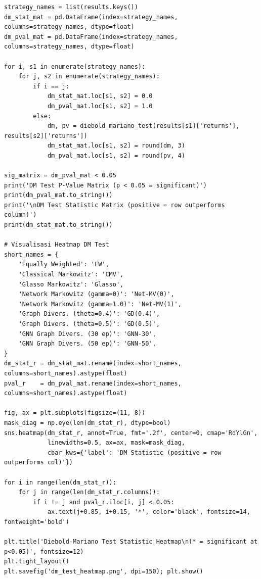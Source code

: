 \documentclass[12pt,a4paper]{article}
\begin{document}
\begin{lstlisting}[caption={Komputasi Matriks DM Test}]
strategy_names = list(results.keys())
dm_stat_mat = pd.DataFrame(index=strategy_names, columns=strategy_names, dtype=float)
dm_pval_mat = pd.DataFrame(index=strategy_names, columns=strategy_names, dtype=float)

for i, s1 in enumerate(strategy_names):
    for j, s2 in enumerate(strategy_names):
        if i == j:
            dm_stat_mat.loc[s1, s2] = 0.0
            dm_pval_mat.loc[s1, s2] = 1.0
        else:
            dm, pv = diebold_mariano_test(results[s1]['returns'], results[s2]['returns'])
            dm_stat_mat.loc[s1, s2] = round(dm, 3)
            dm_pval_mat.loc[s1, s2] = round(pv, 4)

sig_matrix = dm_pval_mat < 0.05
print('DM Test P-Value Matrix (p < 0.05 = significant)')
print(dm_pval_mat.to_string())
print('\nDM Test Statistic Matrix (positive = row outperforms column)')
print(dm_stat_mat.to_string())

# Visualisasi Heatmap DM Test
short_names = {
    'Equally Weighted': 'EW',
    'Classical Markowitz': 'CMV',
    'Glasso Markowitz': 'Glasso',
    'Network Markowitz (gamma=0)': 'Net-MV(0)',
    'Network Markowitz (gamma=1.0)': 'Net-MV(1)',
    'Graph Divers. (theta=0.4)': 'GD(0.4)',
    'Graph Divers. (theta=0.5)': 'GD(0.5)',
    'GNN Graph Divers. (30 ep)': 'GNN-30',
    'GNN Graph Divers. (50 ep)': 'GNN-50',
}
dm_stat_r = dm_stat_mat.rename(index=short_names, columns=short_names).astype(float)
pval_r    = dm_pval_mat.rename(index=short_names, columns=short_names).astype(float)

fig, ax = plt.subplots(figsize=(11, 8))
mask_diag = np.eye(len(dm_stat_r), dtype=bool)
sns.heatmap(dm_stat_r, annot=True, fmt='.2f', center=0, cmap='RdYlGn',
            linewidths=0.5, ax=ax, mask=mask_diag,
            cbar_kws={'label': 'DM Statistic (positive = row outperforms col)'})

for i in range(len(dm_stat_r)):
    for j in range(len(dm_stat_r.columns)):
        if i != j and pval_r.iloc[i, j] < 0.05:
            ax.text(j+0.85, i+0.15, '*', color='black', fontsize=14, fontweight='bold')

plt.title('Diebold-Mariano Test Statistic Heatmap\n(* = significant at p<0.05)', fontsize=12)
plt.tight_layout()
plt.savefig('dm_test_heatmap.png', dpi=150); plt.show()
\end{lstlisting}



\end{document}

